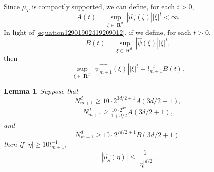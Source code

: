 \documentclass[12pt,reqno]{article}
\numberwithin{equation}{section}
\DeclareMathOperator{\RR}{\mathbf{R}}
\newtheorem{lemma}[theorem]{Lemma}
\begin{document}
Since $\mu_T$ is compactly supported, we can define, for each $t > 0$,
%
\[ A(t) = \sup_{\xi \in \RR^d} |\widehat{\mu_T}(\xi)| |\xi|^t < \infty. \]
%
In light of \eqref{equation12901902419209012}, if we define, for each $t > 0$,
%
\[ B(t) = \sup_{\xi \in \RR^d} |\widehat{\psi}(\xi)| |\xi|^t, \]
%
then
%
\[ \sup_{\xi \in \RR^d} |\widehat{\psi_{m+1}}(\xi)| |\xi|^t = l_{m+1}^{-t} B(t). \]

\begin{lemma} \label{largeFrequencyLemma}
    Suppose that
    \begin{equation} \label{equation129041902412901290129}
        N_{m+1}^d \geq 10 \cdot 2^{3d/2+1} A(3d/2 + 1),
    \end{equation}
    \begin{equation} \label{equation190512919204912901}
    \begin{split}
        N_{m+1}^d \geq \frac{10 \cdot 2^{3d}}{1 + d/2} A(3d/2 + 1),
    \end{split}
    \end{equation}
    and
    \begin{equation} \label{equation68943893493849}
        N_{m+1}^d \geq 10 \cdot 2^{7d/2 + 1} B(3d/2 + 1).
    \end{equation}
    then if $|\eta| \geq 10l_{m+1}^{-1}$,
    \begin{equation} \label{equation66123142190}
        |\widehat{\mu_S}(\eta)| \leq \frac{1}{|\eta|^{d/2}}.
    \end{equation}
\end{lemma}
\end{document}

